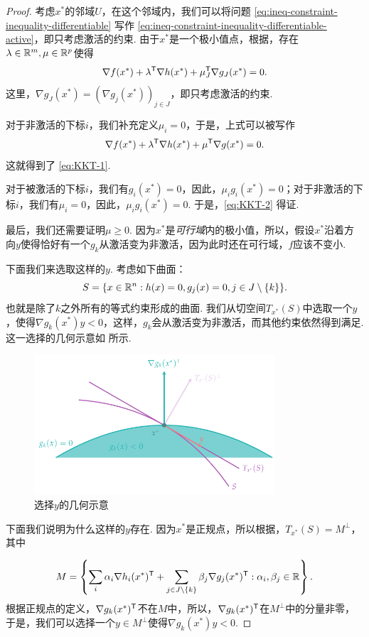 \begin{proof}
考虑$x^*$的邻域$U$，在这个邻域内，我们可以将问题 \eqref{eq:ineq-constraint-inequality-differentiable} 写作 \eqref{eq:ineq-constraint-inequality-differentiable-active}，即只考虑激活的约束. 由于$x^*$是一个极小值点，根据，存在$\lambda\in\mathbb{R}^m,\mu\in\mathbb{R}^p$使得
\[
\nabla f(x^*)+\lambda^{\mathsf{T}} \nabla {h(x^*)}+\mu_J^{\mathsf{T}} \nabla g_J(x^*)=0.
\]
这里，$\nabla g_J(x^*)=(\nabla g_j(x^*))_{j\in J}$，即只考虑激活的约束.

对于非激活的下标$i$，我们补充定义$\mu_i=0$，于是，上式可以被写作
\[\nabla f(x^*)+\lambda^{\mathsf{T}} \nabla {h(x^*)}+\mu^{\mathsf{T}} \nabla g(x^*)=0.\]
这就得到了 \eqref{eq:KKT-1}.

对于被激活的下标$i$，我们有$g_i(x^*)=0$，因此，$\mu_i g_i(x^*)=0$；对于非激活的下标$i$，我们有$\mu_i=0$，因此，$\mu_i g_i(x^*)=0$. 于是，\eqref{eq:KKT-2} 得证.

最后，我们还需要证明$\mu\geq 0$. 因为$x^*$是\textit{可行域}内的极小值，所以，假设$x^*$沿着方向$y$使得恰好有一个$g_k$从激活变为非激活，因为此时还在可行域，$f$应该不变小. 

下面我们来选取这样的$y$. 考虑如下曲面：
\[S=\{x\in\mathbb{R}^n:h(x)=0,g_j(x)=0, j\in J\setminus\{k\}\}.\]
也就是除了$k$之外所有的等式约束形成的曲面. 我们从切空间$T_{x^*}(S)$中选取一个$y$，使得$\nabla g_k(x^*)y<0$，这样，$g_k$会从激活变为非激活，而其他约束依然得到满足. 这一选择的几何示意如 所示.

\begin{figure}[ht]
    \centering
    \includegraphics[width=0.8\textwidth]{figures/duality/select-y.pdf}
    \caption{选择$y$的几何示意}
    \label{fig:select-y}
\end{figure}

下面我们说明为什么这样的$y$存在. 因为$x^*$是正规点，所以根据，$T_{x^*}(S)=M^\perp$，其中

\[M=\left\{\sum_{i} \alpha_i \nabla h_i(x^*)^{\mathsf{T}}+\sum_{j\in J\setminus\{k\}} \beta_j \nabla g_j(x^*)^{\mathsf{T}}:\alpha_i,\beta_j\in\mathbb{R}\right\}.\]
根据正规点的定义，$\nabla g_k(x^*)^{\mathsf{T}}$不在$M$中，所以，$\nabla g_k(x^*)^{\mathsf{T}}$在$M^\perp$中的分量非零，于是，我们可以选择一个$y\in M^\perp$使得$\nabla g_k(x^*)y<0$. 


\end{proof}
